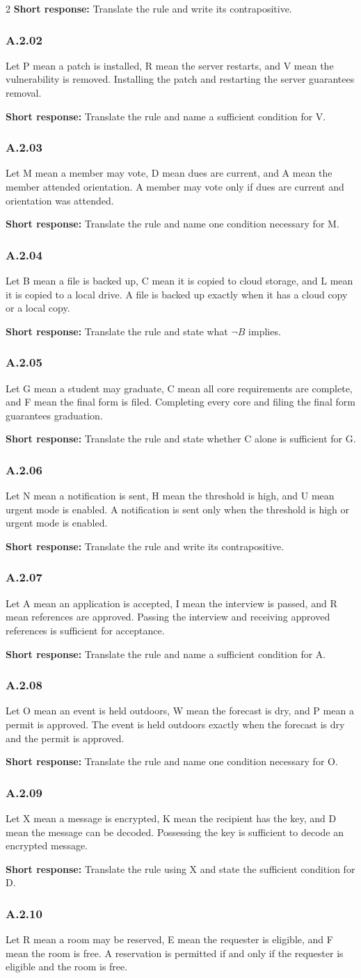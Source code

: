 \documentclass[10pt]{extarticle}
\newcommand{\bankitem}[1]{\subsubsection*{#1}}
\begin{document}
\begin{multicols}{2}
\textbf{Short response:} Translate the rule and write its contrapositive.
\bankitem{A.2.02}
Let P mean a patch is installed, R mean the server restarts, and V mean the vulnerability is removed. Installing the patch and restarting the server guarantees removal.

\textbf{Short response:} Translate the rule and name a sufficient condition for V.
\bankitem{A.2.03}
Let M mean a member may vote, D mean dues are current, and A mean the member attended orientation. A member may vote only if dues are current and orientation was attended.

\textbf{Short response:} Translate the rule and name one condition necessary for M.
\bankitem{A.2.04}
Let B mean a file is backed up, C mean it is copied to cloud storage, and L mean it is copied to a local drive. A file is backed up exactly when it has a cloud copy or a local copy.

\textbf{Short response:} Translate the rule and state what $\neg B$ implies.
\bankitem{A.2.05}
Let G mean a student may graduate, C mean all core requirements are complete, and F mean the final form is filed. Completing every core and filing the final form guarantees graduation.

\textbf{Short response:} Translate the rule and state whether C alone is sufficient for G.
\bankitem{A.2.06}
Let N mean a notification is sent, H mean the threshold is high, and U mean urgent mode is enabled. A notification is sent only when the threshold is high or urgent mode is enabled.

\textbf{Short response:} Translate the rule and write its contrapositive.
\bankitem{A.2.07}
Let A mean an application is accepted, I mean the interview is passed, and R mean references are approved. Passing the interview and receiving approved references is sufficient for acceptance.

\textbf{Short response:} Translate the rule and name a sufficient condition for A.
\bankitem{A.2.08}
Let O mean an event is held outdoors, W mean the forecast is dry, and P mean a permit is approved. The event is held outdoors exactly when the forecast is dry and the permit is approved.

\textbf{Short response:} Translate the rule and name one condition necessary for O.
\bankitem{A.2.09}
Let X mean a message is encrypted, K mean the recipient has the key, and D mean the message can be decoded. Possessing the key is sufficient to decode an encrypted message.

\textbf{Short response:} Translate the rule using X and state the sufficient condition for D.
\bankitem{A.2.10}
Let R mean a room may be reserved, E mean the requester is eligible, and F mean the room is free. A reservation is permitted if and only if the requester is eligible and the room is free.


\end{multicols}
\end{document}
